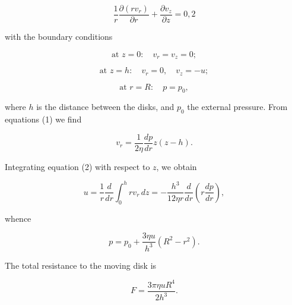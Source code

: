 \documentclass{article}
\begin{document}
$$
\frac{1}{r} \frac{\partial (rv_r)}{\partial r} + \frac{\partial v_z}{\partial z} = 0, {2}
$$

with the boundary conditions

$$
\text{at } z = 0: \quad v_r = v_z = 0;
$$

$$
\text{at } z = h: \quad v_r = 0, \quad v_z = -u;
$$

$$
\text{at } r = R: \quad p = p_0,
$$

where $h$ is the distance between the disks, and $p_0$ the external pressure. From equations (1) we find

$$
v_r = \frac{1}{2\eta} \frac{dp}{dr} z(z - h).
$$

Integrating equation (2) with respect to $z$, we obtain

$$
u = \frac{1}{r} \frac{d}{dr} \int_0^h rv_r \, dz = -\frac{h^3}{12\eta r} \frac{d}{dr} \left( r \frac{dp}{dr} \right),
$$

whence

$$
p = p_0 + \frac{3\eta u}{h^3} (R^2 - r^2).
$$

The total resistance to the moving disk is

$$
F = \frac{3\pi \eta u R^4}{2h^3}.
$$
\end{document}
